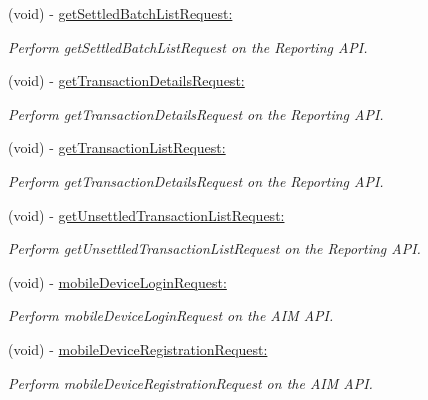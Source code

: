\begin{DoxyCompactItemize}
(void) -\/ \hyperlink{interface_auth_net_a1fa89b0779cc561949082cb567dba157}{getSettledBatchListRequest:}
\begin{DoxyCompactList}\small\item\em Perform getSettledBatchListRequest on the Reporting API. \item\end{DoxyCompactList}\item 
(void) -\/ \hyperlink{interface_auth_net_aceb44273bc91643ae24b3197fe41f5a1}{getTransactionDetailsRequest:}
\begin{DoxyCompactList}\small\item\em Perform getTransactionDetailsRequest on the Reporting API. \item\end{DoxyCompactList}\item 
(void) -\/ \hyperlink{interface_auth_net_aea170727593689d07fd6a522523bf222}{getTransactionListRequest:}
\begin{DoxyCompactList}\small\item\em Perform getTransactionDetailsRequest on the Reporting API. \item\end{DoxyCompactList}\item 
(void) -\/ \hyperlink{interface_auth_net_aa5bdf2aed5018970a50ee6e3184a6bf8}{getUnsettledTransactionListRequest:}
\begin{DoxyCompactList}\small\item\em Perform getUnsettledTransactionListRequest on the Reporting API. \item\end{DoxyCompactList}\item 
(void) -\/ \hyperlink{interface_auth_net_a69e0de01f90a5296752f90fcf5f9e893}{mobileDeviceLoginRequest:}
\begin{DoxyCompactList}\small\item\em Perform mobileDeviceLoginRequest on the AIM API. \item\end{DoxyCompactList}\item 
(void) -\/ \hyperlink{interface_auth_net_a85da8b448835e5dc865772a5fbe2527e}{mobileDeviceRegistrationRequest:}
\begin{DoxyCompactList}\small\item\em Perform mobileDeviceRegistrationRequest on the AIM API. \item\end{DoxyCompactList}\item 

\end{DoxyCompactItemize}

